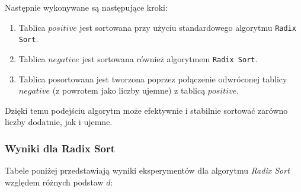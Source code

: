 \documentclass{article}
\begin{document}
Następnie wykonywane są następujące kroki:
\begin{enumerate}
    \item Tablica $positive$ jest sortowana przy użyciu standardowego algorytmu \texttt{Radix Sort}.
    \item Tablica $negative$ jest sortowana również algorytmem \texttt{Radix Sort}.
    \item Tablica posortowana jest tworzona poprzez połączenie odwróconej tablicy $negative$ (z powrotem jako liczby ujemne) z tablicą $positive$.
\end{enumerate}

Dzięki temu podejściu algorytm może efektywnie i stabilnie sortować zarówno liczby dodatnie, jak i ujemne.

\subsubsection{Wyniki dla Radix Sort}
Tabele poniżej przedstawiają wyniki eksperymentów dla algorytmu \textit{Radix Sort} względem różnych podstaw $d$:
\begin{table}[H]
    \centering
    \caption{Liczba operacji dla algorytmu \texttt{Radix Sort} przy podstawie $d$ w zależności od rozmiarów tablicy wejściowej}
    \label{tab:radixsort_results}
\end{table}
\end{document}
